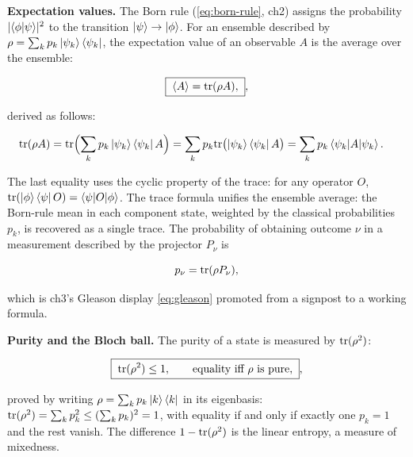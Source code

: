 \medskip\noindent\textbf{Expectation values.}
The Born rule (\eqref{eq:born-rule}, ch2) assigns the probability $\lvert\braket{\phi|\psi}\rvert^2$ to the transition $\ket{\psi} \to \ket{\phi}$. For an ensemble described by $\rho = \sum_k p_k \ket{\psi_k}\bra{\psi_k}$, the expectation value of an observable $A$ is the average over the ensemble:
\begin{linenomath}
\begin{equation}
\boxed{\;
\langle A \rangle = \mathrm{tr}(\rho A),
\;},
\label{eq:density-expectation}
\end{equation}
\end{linenomath}
derived as follows:
\begin{linenomath}
\begin{align}
\mathrm{tr}(\rho A) &= \mathrm{tr}\Bigl(\sum_k p_k \ket{\psi_k}\bra{\psi_k} A\Bigr)
= \sum_k p_k \mathrm{tr}\bigl(\ket{\psi_k}\bra{\psi_k}A\bigr)
= \sum_k p_k \braket{\psi_k|A|\psi_k}.
\end{align}
\end{linenomath}
The last equality uses the cyclic property of the trace: for any operator $O$, $\mathrm{tr}(\ket{\phi}\bra{\psi}O) = \braket{\psi|O|\phi}$. The trace formula unifies the ensemble average: the Born-rule mean in each component state, weighted by the classical probabilities $p_k$, is recovered as a single trace. The probability of obtaining outcome $\nu$ in a measurement described by the projector $P_\nu$ is
\begin{linenomath}
\begin{equation}
p_\nu = \mathrm{tr}(\rho P_\nu),
\end{equation}
\end{linenomath}
which is ch3's Gleason display \eqref{eq:gleason} promoted from a signpost to a working formula.

\medskip\noindent\textbf{Purity and the Bloch ball.}
The purity of a state is measured by $\mathrm{tr}(\rho^2)$:
\begin{linenomath}
\begin{equation}
\boxed{\;
\mathrm{tr}(\rho^2) \le 1,
\qquad
\text{equality iff } \rho \text{ is pure},
\;},
\label{eq:purity}
\end{equation}
\end{linenomath}
proved by writing $\rho = \sum_k p_k \ket{k}\bra{k}$ in its eigenbasis: $\mathrm{tr}(\rho^2) = \sum_k p_k^2 \le (\sum_k p_k)^2 = 1$, with equality if and only if exactly one $p_k = 1$ and the rest vanish. The difference $1 - \mathrm{tr}(\rho^2)$ is the linear entropy, a measure of mixedness.

